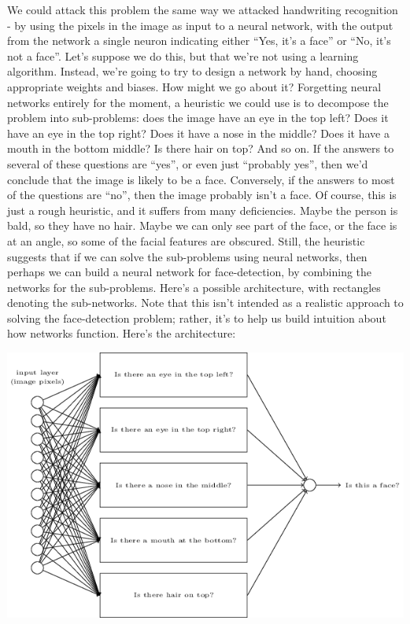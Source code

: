 We could attack this problem the same way we attacked handwriting recognition - by using the pixels in the image as input to a neural network, with the output from the network a single neuron indicating either ``Yes, it's a face'' or ``No, it's not a face''.
Let's suppose we do this, but that we're not using a learning algorithm. Instead, we're going to try to design a network by hand, choosing appropriate weights and biases. How might we go about it? Forgetting neural networks entirely for the moment, a heuristic we could use is to decompose the problem into sub-problems: does the image have an eye in the top left? Does it have an eye in the top right? Does it have a nose in the middle? Does it have a mouth in the bottom middle? Is there hair on top? And so on.
If the answers to several of these questions are ``yes'', or even just ``probably yes'', then we'd conclude that the image is likely to be a face. Conversely, if the answers to most of the questions are ``no'', then the image probably isn't a face.
Of course, this is just a rough heuristic, and it suffers from many deficiencies. Maybe the person is bald, so they have no hair. Maybe we can only see part of the face, or the face is at an angle, so some of the facial features are obscured. Still, the heuristic suggests that if we can solve the sub-problems using neural networks, then perhaps we can build a neural network for face-detection, by combining the networks for the sub-problems. Here's a possible architecture, with rectangles denoting the sub-networks. Note that this isn't intended as a realistic approach to solving the face-detection problem; rather, it's to help us build intuition about how networks function. Here's the architecture:

{\centering
\includegraphics[width=\textwidth,]{pic/tikz14.png}
\par}

